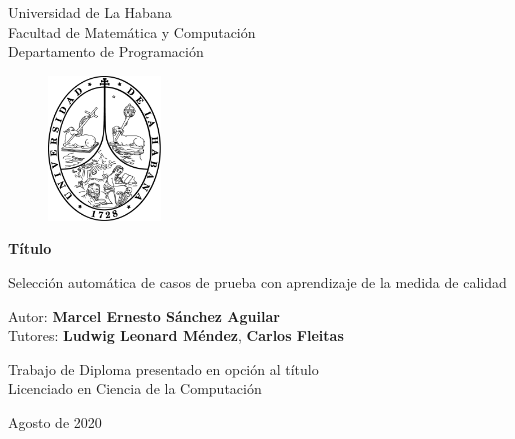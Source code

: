 \documentclass[a4paper,12pt]{book}
\begin{document}
	\begin{titlepage}
		\begin{center}
			\vspace*{-1in}
			Universidad de La Habana \\
			Facultad de Matemática y Computación \\
			Departamento de Programación \\
			\vspace*{0.15in}
			\begin{figure}[htb]
				\begin{center}
					\includegraphics[width=3cm]{./Graphics/uhlogo.pdf}
				\end{center}
			\end{figure}
			
			\vspace*{0.3in}
			\textbf{Título} \\
			\begin{large}
			Selección automática de casos de prueba con aprendizaje de la medida de calidad \\
			\end{large}
			\vspace*{0.6in}
			Autor: \textbf{Marcel Ernesto Sánchez Aguilar} \\
			Tutores: \textbf{Ludwig Leonard Méndez}, \textbf{Carlos Fleitas}
			
			\vspace*{0.4in}
			Trabajo de Diploma presentado en opción al título\\
			Licenciado en Ciencia de la Computación
			
			\vspace*{0.5in}
			Agosto de 2020
			
		\end{center}
	\end{titlepage}

\tableofcontents
\end{document}
